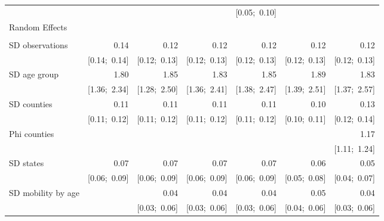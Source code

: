 \begin{sidewaystable}[htp]
\begin{center}
{\begin{tabular}{l D{.}{.}{6.11} D{.}{.}{6.11} D{.}{.}{6.11} D{.}{.}{6.11} D{.}{.}{6.11} D{.}{.}{6.11} }
                               &                 &                 &                 & [0.05;\ 0.10]   &                 &                 \\
Random Effects                 &                 &                 &                 &                 &                 &                 \\
                               &                 &                 &                 &                 &                 &                 \\
\quad SD observations          & 0.14            & 0.12            & 0.12            & 0.12            & 0.12            & 0.12            \\
                               & [0.14;\ 0.14]   & [0.12;\ 0.13]   & [0.12;\ 0.13]   & [0.12;\ 0.13]   & [0.12;\ 0.13]   & [0.12;\ 0.13]   \\
\quad SD age group             & 1.80            & 1.85            & 1.83            & 1.85            & 1.89            & 1.83            \\
                               & [1.36;\ 2.34]   & [1.28;\ 2.50]   & [1.36;\ 2.41]   & [1.38;\ 2.47]   & [1.39;\ 2.51]   & [1.37;\ 2.57]   \\
\quad SD counties              & 0.11            & 0.11            & 0.11            & 0.11            & 0.10            & 0.13            \\
                               & [0.11;\ 0.12]   & [0.11;\ 0.12]   & [0.11;\ 0.12]   & [0.11;\ 0.12]   & [0.10;\ 0.11]   & [0.12;\ 0.14]   \\
\quad Phi counties             &                 &                 &                 &                 &                 & 1.17            \\
                               &                 &                 &                 &                 &                 & [1.11;\ 1.24]   \\
\quad SD states                & 0.07            & 0.07            & 0.07            & 0.07            & 0.06            & 0.05            \\
                               & [0.06;\ 0.09]   & [0.06;\ 0.09]   & [0.06;\ 0.09]   & [0.06;\ 0.09]   & [0.05;\ 0.08]   & [0.04;\ 0.07]   \\
\quad SD mobility by age       &                 & 0.04            & 0.04            & 0.04            & 0.05            & 0.04            \\
                               &                 & [0.03;\ 0.06]   & [0.03;\ 0.06]   & [0.03;\ 0.06]   & [0.04;\ 0.06]   & [0.03;\ 0.06]   \\

\end{tabular}}
\end{center}
\end{sidewaystable}
